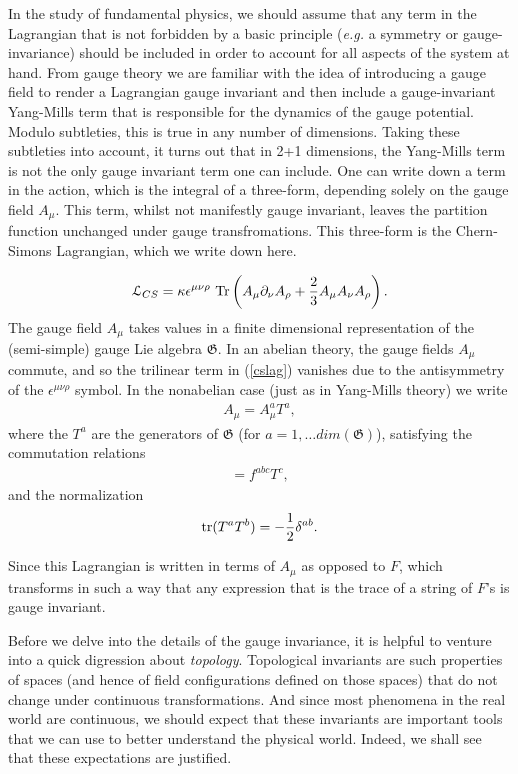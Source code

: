     In the study of fundamental physics, we should assume that any term in the Lagrangian that is not forbidden by a basic principle (\textit{e.g.} a symmetry or gauge-invariance) should be included in order to account for all aspects of the system at hand. From gauge theory we are familiar with the idea of introducing a gauge field to render a Lagrangian gauge invariant and then include a gauge-invariant Yang-Mills term that is responsible for the dynamics of the gauge potential. Modulo subtleties, this is true in any number of dimensions. Taking these subtleties into account, it turns out that in 2+1 dimensions, the Yang-Mills term is not the only gauge invariant term one can include. One can write down a term in the action, which is the integral of a three-form, depending solely on the gauge field $A_{\mu}$. This term, whilst not manifestly gauge invariant, leaves the partition function unchanged under gauge transfromations. This three-form is the Chern-Simons Lagrangian, which we write down here.

\begin{equation}
    {\mathcal{L}}_{CS}= \kappa \epsilon^{\mu\nu\rho} \  \mathrm{Tr} \left ( A_\mu\partial_\nu A_\rho
+{2\over 3} A_\mu A_\nu A_\rho \right ).
\label{cslag}
\end{equation}
The gauge field $A_\mu$ takes values in a finite dimensional representation of
the (semi-simple) gauge Lie algebra ${\mathfrak{G}}$. In an abelian theory, the gauge fields
$A_\mu$ commute, and so the trilinear term in (\eqref{cslag}) vanishes due to the
antisymmetry of the $\epsilon^{\mu\nu\rho}$ symbol. In the nonabelian case (just as in Yang-Mills theory) we write
\begin{align}
    A_\mu=A_\mu^a T^a,
\end{align}
 where the $T^a$ are the generators of ${\mathfrak{G}}$ (for $a=1,\dots dim({\mathfrak{G}})$), satisfying the commutation relations
 \begin{align}
    [T^a,T^b]=f^{abc}T^c,
 \end{align}
and the normalization 
\begin{align}
    {\rm tr}(T^a T^b)=-\frac{1}{2}\delta^{ab}.
\end{align}



    Since this Lagrangian is written in terms of $A_{\mu}$ as opposed to $F$, which transforms in such a way that any expression that is the trace of a string of $F$'s is gauge invariant.

    Before we delve into the details of the gauge invariance, it is helpful to venture into a quick digression about \textit{topology}. Topological invariants are such properties of spaces (and hence of field configurations defined on those spaces) that do not change under continuous transformations. And since most phenomena in the real world are continuous, we should expect that these invariants are important tools that we can use to better understand the physical world. Indeed, we shall see that these expectations are justified. 

